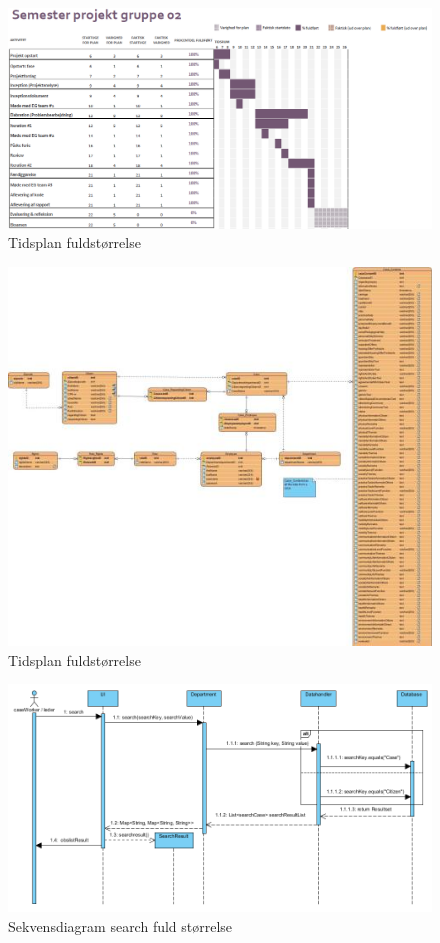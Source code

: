 \begin{landscape}
\begin{figure}
\includegraphics[width = \linewidth]{./PNG/proces/tidsplan.png}
\caption{Tidsplan fuldstørrelse}
\label{fig:tidsplanf}
\end{figure}
\begin{figure}
\includegraphics[width = \linewidth]{./PNG/database/Database.jpg}
\caption{Tidsplan fuldstørrelse}
\label{fig:database}
\end{figure}
\begin{figure}[htb!]
  \includegraphics[width = \linewidth]{./PNG/design/seksearch.PNG} 
  \caption{Sekvensdiagram search fuld størrelse }
  \label{fig:seksearch}
\end{figure}
\end{landscape}
